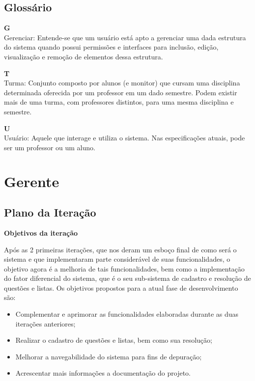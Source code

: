 \documentclass[12pt,letterpaper]{article}
\begin{document}
\pagebreak
\subsection{Glossário}

  {\bf G}\\
    Gerenciar: Entende-se que um usuário está apto a gerenciar uma dada
  estrutura do sistema quando possui permissões e interfaces para inclusão,
  edição, visualização e remoção de elementos dessa estrutura. 
    
  {\bf T}\\
    Turma: Conjunto composto por alunos (e monitor) que cursam uma disciplina 
    determinada oferecida por um professor em um dado semestre. Podem
    existir mais de uma turma, com professores distintos, para uma mesma 
    disciplina e semestre.  
    
  {\bf U}\\
    Usuário: Aquele que interage e utiliza o sistema. Nas especificações
    atuais, pode ser um professor ou um aluno.


\pagebreak
\section{Gerente}

\subsection{Plano da Iteração}

\vspace{1cm}
{\large {\bf Objetivos da iteração}}
\vspace{0.5cm}

Após as 2 primeiras iterações, que nos deram um esboço final de como será o sistema 
e que implementaram parte considerável de suas funcionalidades, o objetivo agora é a 
melhoria de tais funcionalidades, bem como a implementação do fator diferencial do 
sistema, que é o seu sub-sistema de cadastro e resolução de questões e listas.
Os objetivos propostos para a atual fase de desenvolvimento são:

\begin{itemize}
\item{} Complementar e aprimorar as funcionalidades elaboradas durante as duas iterações anteriores;
\item{} Realizar o cadastro de questões e listas, bem como sua resolução;
\item{} Melhorar a navegabilidade do sistema para fins de depuração;
\item{} Acrescentar mais informações a documentação do projeto.
\end{itemize}
\end{document}
